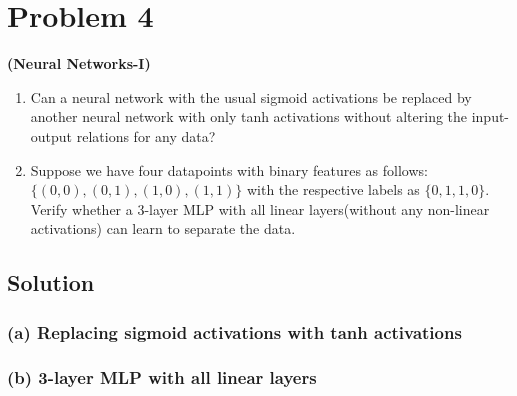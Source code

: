 \section*{Problem 4}

\textbf{(Neural Networks-I)}\\
\begin{enumerate}[label= (\alph*), noitemsep, topsep=0pt]
    \item Can a neural network with the usual sigmoid activations be replaced by another neural network with only tanh activations without altering the input-output relations for any data?

    \item Suppose we have four datapoints with binary features as follows:\\
          \( \{(0,0),(0,1),(1,0),(1,1)\} \) with the respective labels as \( \{0,1,1,0\} \).
          Verify whether a 3-layer MLP with all linear layers(without any non-linear activations) can learn to separate the data.
\end{enumerate}

\subsection*{Solution}

\subsubsection*{(a) Replacing sigmoid activations with tanh activations}

\subsubsection*{(b) 3-layer MLP with all linear layers}
